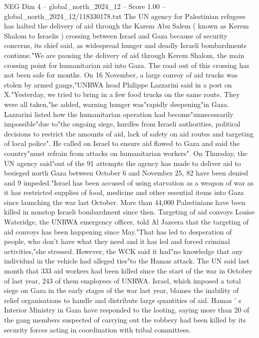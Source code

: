 \begin{textsample}{NEG Dim 4 – global\_north\_2024\_12 – Score 1.00 – global\_north\_2024\_12/118330178.txt}  \label{ex:f4_neg_136}
The UN agency for Palestinian refugees has halted the delivery of aid through the Karem Abu Salem ( known as Kerem Shalom to Israelis ) crossing between Israel and Gaza because of security concerns, its chief said, as widespread hunger and deadly Israeli bombardments continue."We are pausing the delivery of aid through Kerem Shalom, the main crossing point for humanitarian aid into Gaza.
The road out of this crossing has not been safe for months.
On 16 November, a large convoy of aid trucks was stolen by armed gangs,"UNRWA head Philippe Lazzarini said in a post on X."Yesterday, we tried to bring in a few food trucks on the same route.
They were all taken,"he added, warning hunger was"rapidly deepening"in Gaza.
Lazzarini listed how the humanitarian operation had become"unnecessarily impossible"due to"the ongoing siege, hurdles from Israeli authorities, political decisions to restrict the amounts of aid, lack of safety on aid routes and targeting of local police".
He called on Israel to ensure aid flowed to Gaza and said the country"must refrain from attacks on humanitarian workers".
On Thursday, the UN agency said"out of the 91 attempts the agency has made to deliver aid to besieged north Gaza between October 6 and November 25, 82 have been denied and 9 impeded."Israel has been accused of using starvation as a weapon of war as it has restricted supplies of food, medicine and other essential items into Gaza since launching the war last October.
More than 44,000 Palestinians have been killed in nonstop Israeli bombardment since then.
Targeting of aid convoys Louise Wateridge, the UNRWA emergency officer, told Al Jazeera that the targeting of aid convoys has been happening since May."That has led to desperation of people, who don't have what they need and it has led and forced criminal activities,"she stressed.
However, the WCK said it had"no knowledge that any individual in the vehicle had alleged ties"to the Hamas attack.
The UN said last month that 333 aid workers had been killed since the start of the war in October of last year, 243 of them employees of UNRWA.
Israel, which imposed a total siege on Gaza in the early stages of the war last year, blames the inability of relief organisations to handle and distribute large quantities of aid.
Hamas ' s Interior Ministry in Gaza have responded to the looting, saying more than 20 of the gang members suspected of carrying out the robbery had been killed by its security forces acting in coordination with tribal committees.

\end{textsample}
